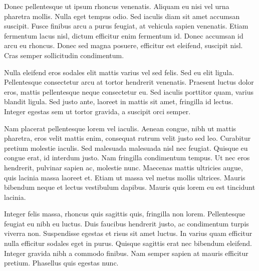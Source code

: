 \documentclass{article}
\begin{document}
Donec pellentesque ut ipsum rhoncus venenatis. Aliquam eu nisi vel urna
pharetra mollis. Nulla eget tempus odio. Sed iaculis diam sit amet
accumsan suscipit. Fusce finibus arcu a purus feugiat, at vehicula
sapien venenatis. Etiam fermentum lacus nisl, dictum efficitur enim
fermentum id. Donec accumsan id arcu eu rhoncus. Donec sed magna
posuere, efficitur est eleifend, suscipit nisl. Cras semper sollicitudin
condimentum.

Nulla eleifend eros sodales elit mattis varius vel sed felis. Sed eu
elit ligula. Pellentesque consectetur arcu at tortor hendrerit
venenatis. Praesent luctus dolor eros, mattis pellentesque neque
consectetur eu. Sed iaculis porttitor quam, varius blandit ligula. Sed
justo ante, laoreet in mattis sit amet, fringilla id lectus. Integer
egestas sem ut tortor gravida, a suscipit orci semper.

Nam placerat pellentesque lorem vel iaculis. Aenean congue, nibh ut
mattis pharetra, eros velit mattis enim, consequat rutrum velit justo
sed leo. Curabitur pretium molestie iaculis. Sed malesuada malesuada
nisl nec feugiat. Quisque eu congue erat, id interdum justo. Nam
fringilla condimentum tempus. Ut nec eros hendrerit, pulvinar sapien ac,
molestie nunc. Maecenas mattis ultricies augue, quis lacinia massa
laoreet et. Etiam ut massa vel metus mollis ultrices. Mauris bibendum
neque et lectus vestibulum dapibus. Mauris quis lorem eu est tincidunt
lacinia.

Integer felis massa, rhoncus quis sagittis quis, fringilla non lorem.
Pellentesque feugiat eu nibh eu luctus. Duis faucibus hendrerit justo,
ac condimentum turpis viverra non. Suspendisse egestas et risus sit amet
luctus. In varius quam efficitur nulla efficitur sodales eget in purus.
Quisque sagittis erat nec bibendum eleifend. Integer gravida nibh a
commodo finibus. Nam semper sapien at mauris efficitur pretium.
Phasellus quis egestas nunc.


\end{document}
